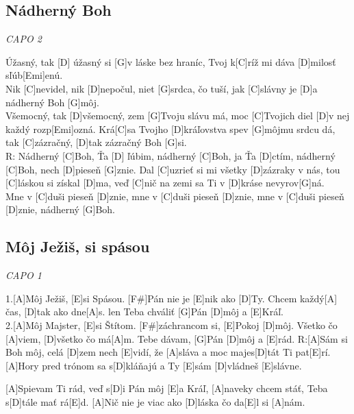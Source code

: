 \documentclass[10pt]{article}
\begin{document}
\begin{Large}
\begin{minipage}{\textwidth}
\subsection{Nádherný Boh}
\textit{CAPO 2}
\begin{multicols*}{3}
\begin{guitar}	
	[C] Úžasný, tak [D] úžasný
	si [G]v láske bez hraníc,
	Tvoj k[C]ríž mi dáva
	[D]milosť sľúb[Emi]enú.
	\\
	Nik [C]nevidel, nik [D]nepočul,
	niet [G]srdca, čo tuší,
	jak [C]slávny je 
	[D]a nádherný Boh [G]môj.
	\\
	[C]Všemocný, tak [D]všemocný,
	zem [G]Tvoju slávu má,
	moc [C]Tvojich diel
	[D]v nej každý rozp[Emi]ozná.
	\columnbreak
	Krá[C]sa Tvojho [D]kráľovstva
	spev [G]môjmu srdcu dá,
	tak [C]zázračný,
	[D]tak zázračný Boh [G]si.
	\\
	R:
	Nádherný [C]Boh, Ťa [D] ľúbim,
	nádherný [C]Boh, ja Ťa [D]ctím,
	nádherný [C]Boh, nech [D]pieseň 
	[G]znie.
	\columnbreak
	Dal [C]uzrieť si mi
	všetky [D]zázraky v nás,
	tou [C]láskou si získal [D]ma,
	veď [C]nič na zemi
	sa Ti v [D]kráse nevyrov[G]ná.
	\\
	Mne v [C]duši pieseň [D]znie,
	mne v [C]duši pieseň [D]znie,
	mne v [C]duši pieseň [D]znie,
	nádherný [G]Boh.
\end{guitar}
\end{multicols*}
\end{minipage}

\begin{minipage}{\textwidth}
\subsection{Môj Ježiš, si spásou}
\textit{CAPO 1}
\begin{multicols*}{2}
\begin{guitar}	
	1.[A]Môj Ježiš, [E]si Spásou.
	[F#]Pán nie je [E]nik ako [D]Ty.
	Chcem každý[A] čas,
	[D]tak ako dne[A]s.
	len Teba chváliť
	[G]Pán [D]môj a [E]Kráľ.
	\\
	2.[A]Môj Majster, [E]si Štítom.
	[F#]záchrancom si, [E]Pokoj [D]môj.
	Všetko čo [A]viem,
	[D]všetko čo má[A]m.
	Tebe dávam,
	[G]Pán [D]môj a [E]rád.
	\columnbreak
	R:[A]Sám si Boh môj, celá [D]zem nech [E]vidí,
	že [A]sláva a moc majes[D]tát Ti pat[E]rí.
	[A]Hory pred trónom sa s[D]kláňajú
	a Ty [E]sám [D]vládneš [E]slávne.
	
	[A]Spievam Ti rád, veď s[D]i Pán môj [E]a Kráľ,
	[A]naveky chcem stáť, Teba s[D]tále mať rá[E]d.
	[A]Nič nie je viac ako [D]láska čo da[E]l si [A]nám.
\end{guitar}
\end{multicols*}
\end{minipage}


\end{Large}
\end{document}
